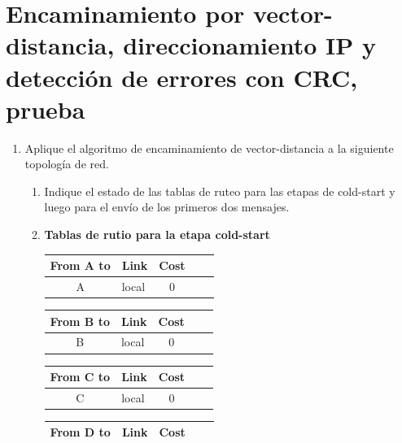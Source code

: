 \section*{Encaminamiento por vector-distancia, direccionamiento IP y detecci\'on de errores con CRC, prueba}

\begin{enumerate}
    \item Aplique el algoritmo de encaminamiento de vector-distancia a la siguiente topolog\'ia de red.
    \begin{enumerate}
        \item Indique el estado de las tablas de ruteo para las etapas de cold-start y luego para el env\'io de los primeros
        dos mensajes.
        \item[] \textbf{Tablas de rutio para la etapa cold-start}
        \begin{table}[H]
            \begin{tabular}{@{}clcll@{}}
                \toprule
                From A to            & \multicolumn{1}{c}{Link} & Cost                 \\ \midrule
                A                    & local                    & 0                    \\ \bottomrule
            \end{tabular}
            \hfill
            \begin{tabular}{@{}clcll@{}}
                \toprule
                From B to            & \multicolumn{1}{c}{Link} & Cost                 \\ \midrule
                B                    & local                    & 0                    \\ \bottomrule
            \end{tabular}
            \hfill
            \begin{tabular}{@{}clcll@{}}
                \toprule
                From C to            & \multicolumn{1}{c}{Link} & Cost                 \\ \midrule
                C                    & local                    & 0                    \\ \bottomrule
            \end{tabular}
        \end{table}
        \begin{table}[H]
            \begin{tabular}{@{}clcll@{}}
                \toprule
                From D to            & \multicolumn{1}{c}{Link} & Cost                 \\ \midrule

\end{tabular}
\end{table}
\end{enumerate}
\end{enumerate}
